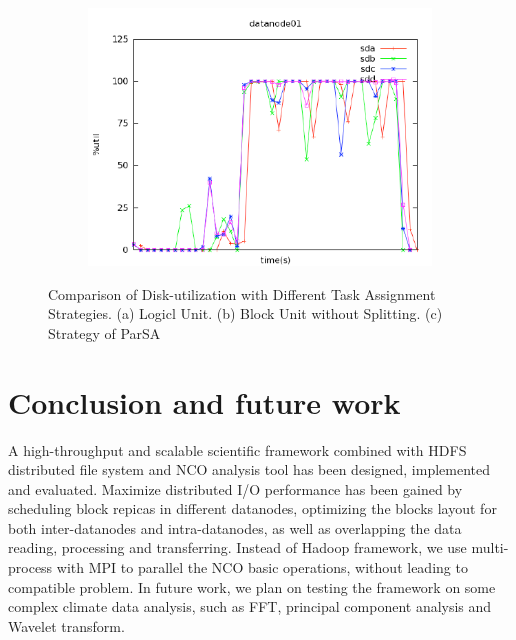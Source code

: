 \documentclass[preprint,12pt]{elsarticle}
\begin{document}
\begin{figure}[tbh]
\begin{subfigure}{0.5\textwidth}
        \includegraphics[width=\textwidth]{figure10c}%
        \caption{}
        \label{figure10c}
    \end{subfigure}
    \caption{Comparison of Disk-utilization with Different Task Assignment Strategies. (a) Logicl Unit. (b) Block Unit without Splitting. 
             (c) Strategy of ParSA}
    \label{figure10}
\end{figure}

\section{Conclusion and future work}
A high-throughput and scalable scientific framework combined with HDFS distributed file system and NCO analysis tool has been designed, 
implemented and evaluated. Maximize distributed I/O performance has been gained by scheduling block repicas in different datanodes, 
optimizing the blocks layout for both inter-datanodes and intra-datanodes,  as well as overlapping the data reading, processing and 
transferring. Instead of Hadoop framework, we use multi-process with MPI to parallel the NCO basic operations, without leading to compatible 
problem. In future work, we plan on testing the framework on some complex climate data analysis, such as FFT, principal component analysis 
and Wavelet transform.

	

\end{document}
